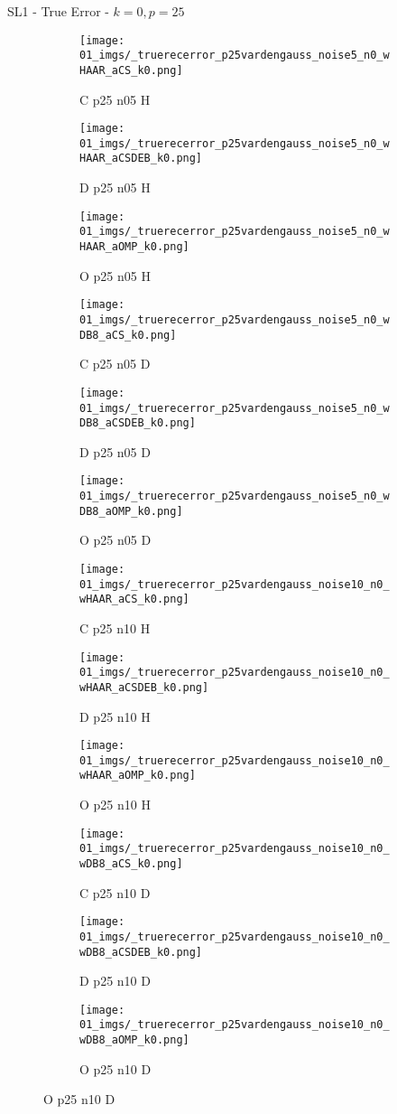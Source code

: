\begin{frame}{SL1 - True Error - $k=0,p=25$}{}
\begin{figure}
\begin{subfigure}{0.13\textwidth}
\texttt{[image: 01\_imgs/\_truerecerror\_p25vardengauss\_noise5\_n0\_wHAAR\_aCS\_k0.png]}
\caption*{\tiny C p25 n05 H}
\end{subfigure}
\begin{subfigure}{0.13\textwidth}
\texttt{[image: 01\_imgs/\_truerecerror\_p25vardengauss\_noise5\_n0\_wHAAR\_aCSDEB\_k0.png]}
\caption*{\tiny D p25 n05 H}
\end{subfigure}
\begin{subfigure}{0.13\textwidth}
\texttt{[image: 01\_imgs/\_truerecerror\_p25vardengauss\_noise5\_n0\_wHAAR\_aOMP\_k0.png]}
\caption*{\tiny O p25 n05 H}
\end{subfigure}
\begin{subfigure}{0.13\textwidth}
\texttt{[image: 01\_imgs/\_truerecerror\_p25vardengauss\_noise5\_n0\_wDB8\_aCS\_k0.png]}
\caption*{\tiny C p25 n05 D}
\end{subfigure}
\begin{subfigure}{0.13\textwidth}
\texttt{[image: 01\_imgs/\_truerecerror\_p25vardengauss\_noise5\_n0\_wDB8\_aCSDEB\_k0.png]}
\caption*{\tiny D p25 n05 D}
\end{subfigure}
\begin{subfigure}{0.13\textwidth}
\texttt{[image: 01\_imgs/\_truerecerror\_p25vardengauss\_noise5\_n0\_wDB8\_aOMP\_k0.png]}
\caption*{\tiny O p25 n05 D}
\end{subfigure}

\vspace{5pt}

\begin{subfigure}{0.13\textwidth}
\texttt{[image: 01\_imgs/\_truerecerror\_p25vardengauss\_noise10\_n0\_wHAAR\_aCS\_k0.png]}
\caption*{\tiny C p25 n10 H}
\end{subfigure}
\begin{subfigure}{0.13\textwidth}
\texttt{[image: 01\_imgs/\_truerecerror\_p25vardengauss\_noise10\_n0\_wHAAR\_aCSDEB\_k0.png]}
\caption*{\tiny D p25 n10 H}
\end{subfigure}
\begin{subfigure}{0.13\textwidth}
\texttt{[image: 01\_imgs/\_truerecerror\_p25vardengauss\_noise10\_n0\_wHAAR\_aOMP\_k0.png]}
\caption*{\tiny O p25 n10 H}
\end{subfigure}
\begin{subfigure}{0.13\textwidth}
\texttt{[image: 01\_imgs/\_truerecerror\_p25vardengauss\_noise10\_n0\_wDB8\_aCS\_k0.png]}
\caption*{\tiny C p25 n10 D}
\end{subfigure}
\begin{subfigure}{0.13\textwidth}
\texttt{[image: 01\_imgs/\_truerecerror\_p25vardengauss\_noise10\_n0\_wDB8\_aCSDEB\_k0.png]}
\caption*{\tiny D p25 n10 D}
\end{subfigure}
\begin{subfigure}{0.13\textwidth}
\texttt{[image: 01\_imgs/\_truerecerror\_p25vardengauss\_noise10\_n0\_wDB8\_aOMP\_k0.png]}
\caption*{\tiny O p25 n10 D}
\end{subfigure}


\end{figure}
\end{frame}
